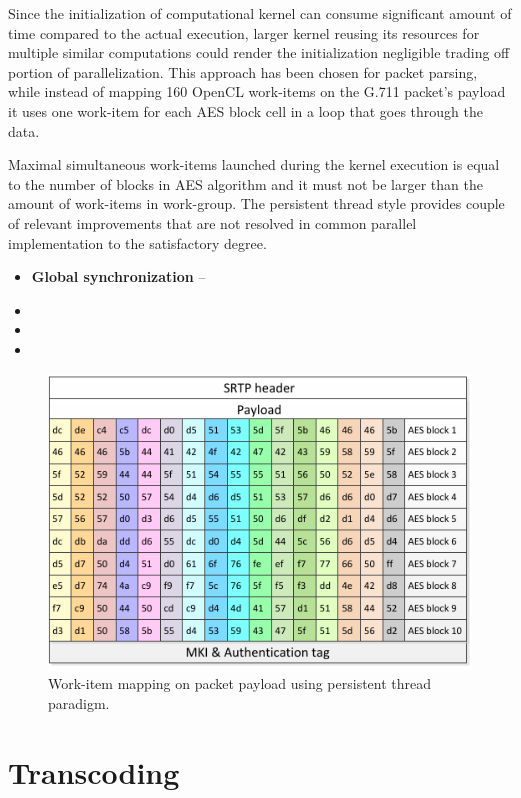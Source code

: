 Since the initialization of computational kernel can consume significant amount 
of time compared to the actual execution, larger kernel reusing its resources 
for multiple similar computations could render the initialization negligible 
trading off portion of parallelization. This approach has been chosen for
packet parsing, while instead of mapping 160 OpenCL work-items on the G.711 
packet's payload it uses one work-item for each AES block cell in a loop that 
goes through the data.

Maximal simultaneous work-items launched during the kernel execution is equal
to the number of blocks in AES algorithm and it must not be larger than the
amount of work-items in work-group. The persistent thread style provides 
couple of relevant improvements that are not resolved in common parallel 
implementation to the satisfactory degree.

\begin{itemize}
\item \textbf{Global synchronization} -- 
\item
\item
\item
\end{itemize}

\begin{figure}[H]
\centering
\includegraphics[width=13cm]{fig/packet_wi.pdf}
\caption{Work-item mapping on packet payload using persistent thread paradigm.}
\label{pt_payload}
\end{figure}


\section{Transcoding}
 

